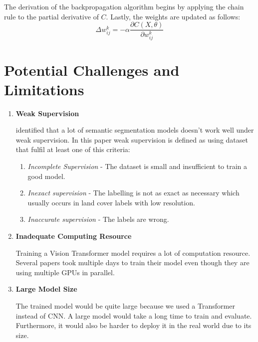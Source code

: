 The derivation of the backpropagation algorithm begins by applying the chain rule to the partial derivative of $C$. Lastly, the weights are updated as follows:
\begin{equation}
    \Delta w_{ij}^k = - \alpha \frac{\partial C(X,\theta)}{\partial w_{ij}^k}
\end{equation}

\section{Potential Challenges and Limitations}

\begin{enumerate}
    \item \textbf{Weak Supervision}
        
        \cite{weakly-supervised-semantic} identified that a lot of semantic segmentation models doesn't work well under weak supervision. In this paper weak supervision is defined as using dataset that fulfil at least one of this criteria:
\begin{enumerate}
    \item \textit{Incomplete Supervision} - The dataset is small and insufficient to train a good model.
    \item \textit{Inexact supervision} - The labelling is not as exact as necessary which usually occurs in land cover labels with low resolution.
    \item \textit{Inaccurate supervision} - The labels are wrong.
\end{enumerate}
\item \textbf{Inadequate Computing Resource}
    
    Training a Vision Transformer model requires a lot of computation resource. Several papers took multiple days to train their model even though they are using multiple GPUs in parallel. 

\item \textbf{Large Model Size}

    The trained model would be quite large because we used a Transformer instead of CNN. A large model would take a long time to train and evaluate. Furthermore, it would also be harder to deploy it in the real world due to its size.

\end{enumerate}

